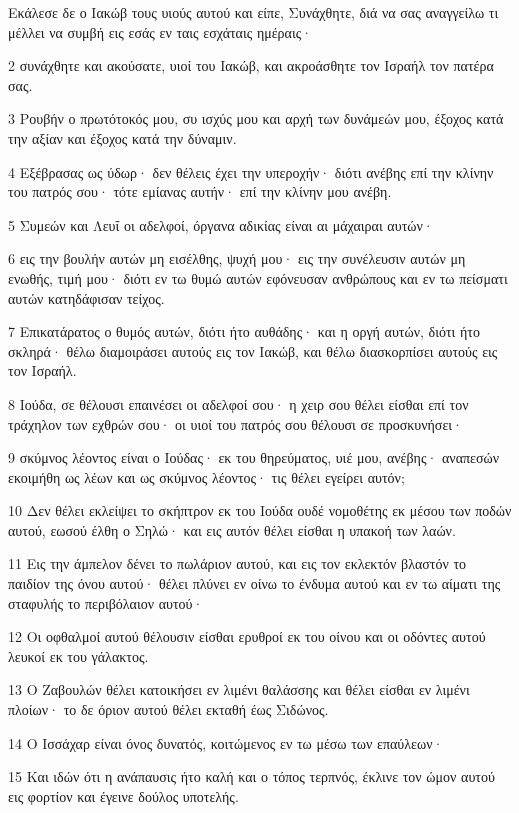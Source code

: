\par Εκάλεσε δε ο Ιακώβ τους υιούς αυτού και είπε, Συνάχθητε, διά να σας αναγγείλω τι μέλλει να συμβή εις εσάς εν ταις εσχάταις ημέραις·
\par 2 συνάχθητε και ακούσατε, υιοί του Ιακώβ, και ακροάσθητε τον Ισραήλ τον πατέρα σας.
\par 3 Ρουβήν ο πρωτότοκός μου, συ ισχύς μου και αρχή των δυνάμεών μου, έξοχος κατά την αξίαν και έξοχος κατά την δύναμιν.
\par 4 Εξέβρασας ως ύδωρ· δεν θέλεις έχει την υπεροχήν· διότι ανέβης επί την κλίνην του πατρός σου· τότε εμίανας αυτήν· επί την κλίνην μου ανέβη.
\par 5 Συμεών και Λευΐ οι αδελφοί, όργανα αδικίας είναι αι μάχαιραι αυτών·
\par 6 εις την βουλήν αυτών μη εισέλθης, ψυχή μου· εις την συνέλευσιν αυτών μη ενωθής, τιμή μου· διότι εν τω θυμώ αυτών εφόνευσαν ανθρώπους και εν τω πείσματι αυτών κατηδάφισαν τείχος.
\par 7 Επικατάρατος ο θυμός αυτών, διότι ήτο αυθάδης· και η οργή αυτών, διότι ήτο σκληρά· θέλω διαμοιράσει αυτούς εις τον Ιακώβ, και θέλω διασκορπίσει αυτούς εις τον Ισραήλ.
\par 8 Ιούδα, σε θέλουσι επαινέσει οι αδελφοί σου· η χειρ σου θέλει είσθαι επί τον τράχηλον των εχθρών σου· οι υιοί του πατρός σου θέλουσι σε προσκυνήσει·
\par 9 σκύμνος λέοντος είναι ο Ιούδας· εκ του θηρεύματος, υιέ μου, ανέβης· αναπεσών εκοιμήθη ως λέων και ως σκύμνος λέοντος· τις θέλει εγείρει αυτόν;
\par 10 Δεν θέλει εκλείψει το σκήπτρον εκ του Ιούδα ουδέ νομοθέτης εκ μέσου των ποδών αυτού, εωσού έλθη ο Σηλώ· και εις αυτόν θέλει είσθαι η υπακοή των λαών.
\par 11 Εις την άμπελον δένει το πωλάριον αυτού, και εις τον εκλεκτόν βλαστόν το παιδίον της όνου αυτού· θέλει πλύνει εν οίνω το ένδυμα αυτού και εν τω αίματι της σταφυλής το περιβόλαιον αυτού·
\par 12 Οι οφθαλμοί αυτού θέλουσιν είσθαι ερυθροί εκ του οίνου και οι οδόντες αυτού λευκοί εκ του γάλακτος.
\par 13 Ο Ζαβουλών θέλει κατοικήσει εν λιμένι θαλάσσης και θέλει είσθαι εν λιμένι πλοίων· το δε όριον αυτού θέλει εκταθή έως Σιδώνος.
\par 14 Ο Ισσάχαρ είναι όνος δυνατός, κοιτώμενος εν τω μέσω των επαύλεων·
\par 15 Και ιδών ότι η ανάπαυσις ήτο καλή και ο τόπος τερπνός, έκλινε τον ώμον αυτού εις φορτίον και έγεινε δούλος υποτελής.
